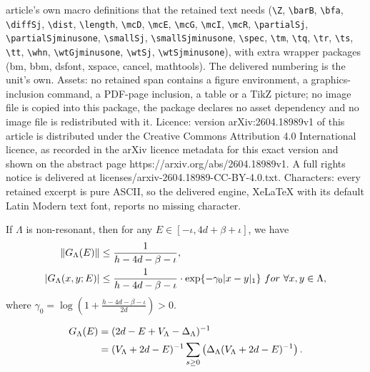 \documentclass[10pt,a4paper]{amsart}
\begin{document}
article's own macro definitions that the retained text needs (\texttt{\textbackslash Z}, \texttt{\textbackslash barB}, \texttt{\textbackslash bfa}, \texttt{\textbackslash diffSj}, \texttt{\textbackslash dist}, \texttt{\textbackslash length}, \texttt{\textbackslash mcD}, \texttt{\textbackslash mcE}, \texttt{\textbackslash mcG}, \texttt{\textbackslash mcI}, \texttt{\textbackslash mcR}, \texttt{\textbackslash partialSj}, \texttt{\textbackslash partialSjminusone}, \texttt{\textbackslash smallSj}, \texttt{\textbackslash smallSjminusone}, \texttt{\textbackslash spec}, \texttt{\textbackslash tm}, \texttt{\textbackslash tq}, \texttt{\textbackslash tr}, \texttt{\textbackslash ts}, \texttt{\textbackslash tt}, \texttt{\textbackslash whn}, \texttt{\textbackslash wtGjminusone}, \texttt{\textbackslash wtSj}, \texttt{\textbackslash wtSjminusone}), with extra wrapper packages (bm, bbm, dsfont, xspace, cancel, mathtools). The delivered numbering is the unit's own. Assets: no retained span contains a figure environment, a graphics-inclusion command, a PDF-page inclusion, a table or a TikZ picture; no image file is copied into this package, the package declares no asset dependency and no image file is redistributed with it. Licence: version arXiv:2604.18989v1 of this article is distributed under the Creative Commons Attribution 4.0 International licence, as recorded in the arXiv licence metadata for this exact version and shown on the abstract page https://arxiv.org/abs/2604.18989v1. A full rights notice is delivered at licenses/arxiv-2604.18989-CC-BY-4.0.txt. Characters: every retained excerpt is pure ASCII, so the delivered engine, XeLaTeX with its default Latin Modern text font, reports no missing character.
\begin{lem}\label{non-resonant Green's function}
  If $\Lambda$ is non-resonant, then for any  $E\in [-\iota,4d+\beta+\iota]$, we have
  \begin{align}
   \label{non-resonant L2 norm} \|G_{\Lambda}(E)\|&\leq  \frac{1}{h-4d-\beta-\iota},\\
    \label{no-resonant off-diagonal decay} |G_{\Lambda}(x,y;E)| &\leq  \frac{1}{h-4d-\beta-\iota} \cdot \exp\{-\gamma_0 |x-y|_1\} \ {\rm for}\  \forall x,y \in \Lambda, 
  \end{align}
  where  $\gamma_0=\log(1+\frac{h-4d-\beta-\iota}{2d})>0$.
\end{lem}

  \begin{align}\label{Neumann series expansion}
  \notag  G_{\Lambda}(E) & = (2d-E+V_{\Lambda}-\Delta_{\Lambda})^{-1} \\
           &=(V_{\Lambda}+2d-E)^{-1} \sum_{s\geq 0} \left(  \Delta_{\Lambda} (V_{\Lambda}+2d-E)^{-1}\right). 
  \end{align}
\end{document}
